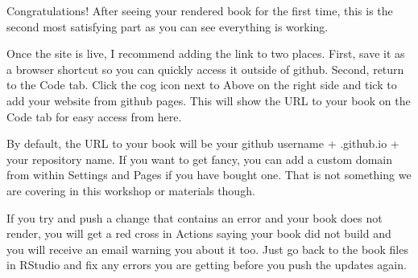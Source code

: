 \documentclass[
  letterpaper,
  DIV=11,
  numbers=noendperiod]{scrreprt}
\begin{document}
Congratulations! After seeing your rendered book for the first time,
this is the second most satisfying part as you can see everything is
working.

\begin{tcolorbox}[enhanced jigsaw, colbacktitle=quarto-callout-tip-color!10!white, titlerule=0mm, leftrule=.75mm, title=\textcolor{quarto-callout-tip-color}{\faLightbulb}\hspace{0.5em}{Add shortcuts to your book}, breakable, bottomrule=.15mm, opacitybacktitle=0.6, rightrule=.15mm, opacityback=0, arc=.35mm, colframe=quarto-callout-tip-color-frame, toptitle=1mm, bottomtitle=1mm, toprule=.15mm, left=2mm, colback=white, coltitle=black]

Once the site is live, I recommend adding the link to two places. First,
save it as a browser shortcut so you can quickly access it outside of
github. Second, return to the Code tab. Click the cog icon next to Above
on the right side and tick to add your website from github pages. This
will show the URL to your book on the Code tab for easy access from
here.

\end{tcolorbox}

\begin{tcolorbox}[enhanced jigsaw, colbacktitle=quarto-callout-tip-color!10!white, titlerule=0mm, leftrule=.75mm, title=\textcolor{quarto-callout-tip-color}{\faLightbulb}\hspace{0.5em}{Customise the URL}, breakable, bottomrule=.15mm, opacitybacktitle=0.6, rightrule=.15mm, opacityback=0, arc=.35mm, colframe=quarto-callout-tip-color-frame, toptitle=1mm, bottomtitle=1mm, toprule=.15mm, left=2mm, colback=white, coltitle=black]

By default, the URL to your book will be your github username +
.github.io + your repository name. If you want to get fancy, you can add
a custom domain from within Settings and Pages if you have bought one.
That is not something we are covering in this workshop or materials
though.

\end{tcolorbox}

\begin{tcolorbox}[enhanced jigsaw, colbacktitle=quarto-callout-warning-color!10!white, titlerule=0mm, leftrule=.75mm, title=\textcolor{quarto-callout-warning-color}{\faExclamationTriangle}\hspace{0.5em}{Warning}, breakable, bottomrule=.15mm, opacitybacktitle=0.6, rightrule=.15mm, opacityback=0, arc=.35mm, colframe=quarto-callout-warning-color-frame, toptitle=1mm, bottomtitle=1mm, toprule=.15mm, left=2mm, colback=white, coltitle=black]

If you try and push a change that contains an error and your book does
not render, you will get a red cross in Actions saying your book did not
build and you will receive an email warning you about it too. Just go
back to the book files in RStudio and fix any errors you are getting
before you push the updates again.

\end{tcolorbox}
\end{document}
